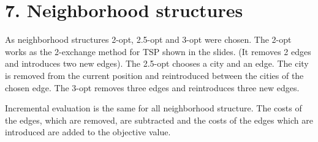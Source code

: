 \section*{7. Neighborhood structures}
As neighborhood structures 2-opt, 2.5-opt and 3-opt were chosen. The 2-opt works as the 2-exchange method for TSP shown in the slides. (It removes 2 edges and introduces two new edges). The 2.5-opt chooses a city and an edge. The city is removed from the current position and reintroduced between the cities of the chosen edge. The 3-opt removes three edges and reintroduces three new edges.

Incremental evaluation is the same for all neighborhood structure. The costs of the edges, which are removed, are subtracted and the costs of the edges which are introduced are added to the objective value.

